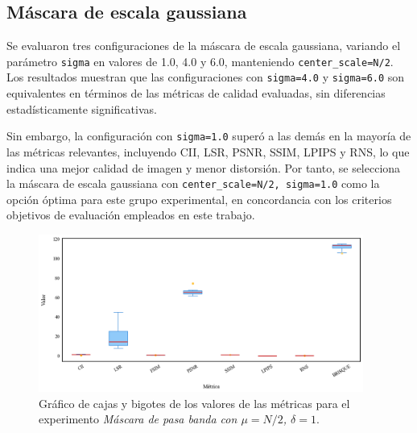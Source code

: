 \subsection{Máscara de escala gaussiana}

Se evaluaron tres configuraciones de la máscara de escala gaussiana, variando el parámetro \texttt{sigma} en valores de 1.0, 4.0 y 6.0, manteniendo \texttt{center\_scale=N/2}. Los resultados muestran que las configuraciones con \texttt{sigma=4.0} y \texttt{sigma=6.0} son equivalentes en términos de las métricas de calidad evaluadas, sin diferencias estadísticamente significativas.

Sin embargo, la configuración con \texttt{sigma=1.0} superó a las demás en la mayoría de las métricas relevantes, incluyendo CII, LSR, PSNR, SSIM, LPIPS y RNS, lo que indica una mejor calidad de imagen y menor distorsión. Por tanto, se selecciona la máscara de escala gaussiana con \texttt{center\_scale=N/2, sigma=1.0} como la opción óptima para este grupo experimental, en concordancia con los criterios objetivos de evaluación empleados en este trabajo.

\begin{figure}[H]
    \centering
    \includegraphics[width=0.95\textwidth]{Graphics/boxplot-gaussian-mask.png}
    \caption{Gráfico de cajas y bigotes de los valores de las métricas para el experimento \textit{Máscara de pasa banda con $\mu = N/2$, $\delta=1$}.}
    \label{fig:boxplot-gaussian}
\end{figure}

